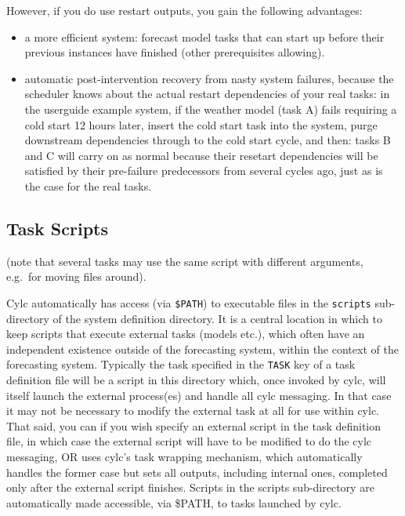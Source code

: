 \documentclass[11pt,a4paper]{article}
\begin{document}
However, if you do use restart outputs, you gain the following advantages:

\begin{itemize}

    \item a more efficient system: forecast model tasks that can start
        up before their previous instances have finished (other
        prerequisites allowing).  
    
    \item automatic post-intervention recovery from nasty system
        failures, because the scheduler knows about the actual restart
        dependencies of your real tasks: in the userguide example
        system, if the weather model (task A) fails requiring a cold
        start 12 hours later, insert the cold start task into the
        system, purge downstream dependencies through to the cold start
        cycle, and then: tasks B and C will carry on as normal because 
        their resetart dependencies will be satisfied by their
        pre-failure predecessors from several cycles ago, just as is the
        case for the real tasks.

\end{itemize}

\pagebreak
\subsection{Task Scripts}
\label{TaskScripts}

(note that several tasks may use the same script with different
arguments, e.g.\ for moving files around).

Cylc automatically has access (via \lstinline=$PATH=) to executable
files in the \lstinline=scripts= sub-directory of the system definition
directory. It is a central location in which to keep scripts that
execute external tasks (models etc.), which often have an independent
existence outside of the forecasting system, within the context of the
forecasting system.
Typically the task specified in the \lstinline=TASK=
key of a task definition file will be a script in this directory which,
once invoked by cylc, will itself launch the external process(es) and
handle all cylc messaging. In that case it may not be necessary to
modify the external task at all for use within cylc. That said, you can
if you wish specify an external script in the task definition file, in
which case the external script will have to be modified to do the cylc
messaging, OR uses cylc's task wrapping mechanism, which automatically
handles the former case but sets all outputs, including internal ones,
completed only after the external script finishes.  Scripts in the
scripts sub-directory are automatically made accessible, via \$PATH, to
tasks launched by cylc. 
\end{document}
